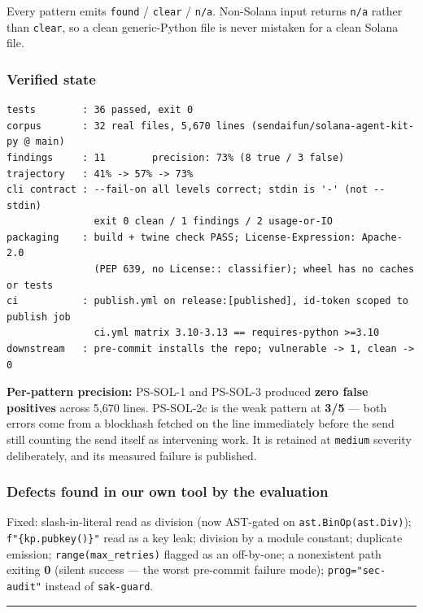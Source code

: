 \documentclass[10pt,a4paper]{article}
\begin{document}
Every pattern emits \texttt{found} / \texttt{clear} / \texttt{n/a}. Non-Solana input returns \texttt{n/a}
rather than \texttt{clear}, so a clean generic-Python file is never mistaken for a
clean Solana file.

\subsubsection*{Verified state}

\begin{verbatim}
tests        : 36 passed, exit 0
corpus       : 32 real files, 5,670 lines (sendaifun/solana-agent-kit-py @ main)
findings     : 11        precision: 73% (8 true / 3 false)
trajectory   : 41% -> 57% -> 73%
cli contract : --fail-on all levels correct; stdin is '-' (not --stdin)
               exit 0 clean / 1 findings / 2 usage-or-IO
packaging    : build + twine check PASS; License-Expression: Apache-2.0
               (PEP 639, no License:: classifier); wheel has no caches or tests
ci           : publish.yml on release:[published], id-token scoped to publish job
               ci.yml matrix 3.10-3.13 == requires-python >=3.10
downstream   : pre-commit installs the repo; vulnerable -> 1, clean -> 0
\end{verbatim}

\textbf{Per-pattern precision:} PS-SOL-1 and PS-SOL-3 produced \textbf{zero false positives}
across 5,670 lines. PS-SOL-2c is the weak pattern at \textbf{3/5} --- both errors come
from a blockhash fetched on the line immediately before the send still counting
the send itself as intervening work. It is retained at \texttt{medium} severity
deliberately, and its measured failure is published.

\subsubsection*{Defects found in our own tool by the evaluation}

Fixed: slash-in-literal read as division (now AST-gated on \texttt{ast.BinOp(ast.Div)});
\texttt{f"\{kp.pubkey()\}"} read as a key leak; division by a module constant;
duplicate emission; \texttt{range(max\_retries)} flagged as an off-by-one;
a nonexistent path exiting \textbf{0} (silent success --- the worst pre-commit failure
mode); \texttt{prog="sec-audit"} instead of \texttt{sak-guard}.

\vspace{3pt}\hrule\vspace{5pt}
\end{document}
